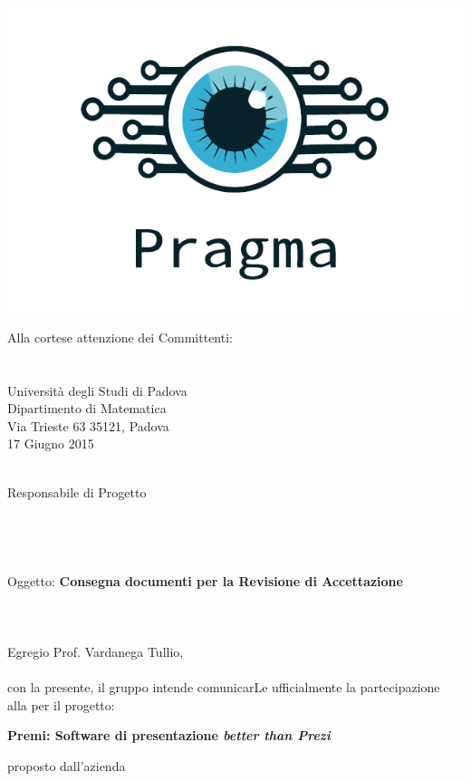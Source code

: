 \documentclass[12pt,a4paper]{article} %
\begin{document}
\begin{center}
\includegraphics[scale=0.6]{../template/icone/logo.pdf}
\end{center}
\hspace{\fill}\parbox[t]{8cm}{
\noindent
Alla cortese attenzione dei Committenti:\\
\committente \\
\committenteAlt \\
Università degli Studi di Padova \\
Dipartimento di Matematica \\
Via Trieste 63 35121, Padova \\
17 Giugno 2015
}
\\
Responsabile di Progetto\\
\gruppo \\
\groupmail \\
\\
\\
Oggetto: \textbf{Consegna documenti per la Revisione di Accettazione} \\
\\
\\
\\
\noindent Egregio Prof. Vardanega Tullio,\\
\\
con la presente, il gruppo \gruppo intende comunicarLe ufficialmente la partecipazione alla \RA per il progetto:\\
\begin{center}
\textbf{Premi: Software di presentazione \textit{better than Prezi}}
\end{center}
proposto dall'azienda \proponente \\
\end{document}
